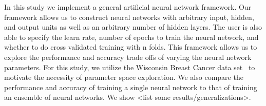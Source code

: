 In this study we implement a general artificial neural network framework.
Our framework allows us to construct neural networks with arbitrary input, hidden, and output units as well as an arbitrary number of hidden layers.
The user is also able to specify the learn rate, number of epochs to train the neural network, and whether to do cross validated training with n folds.
This framework allows us to explore the performance and accuracy trade offs of varying the neural network parameters.
For this study, we utilize the Wisconsin Breast Cancer data set~\cite{wolberg1990multisurface} to motivate the necessity of parameter space exploration.
We also compare the performance and accuracy of training a single neural network to that of training an ensemble of neural networks.
We show <list some results/generalizations>.

